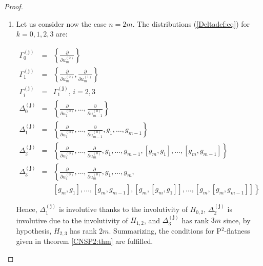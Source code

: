 \documentclass[10pt]{article}
\newcommand{\3}{\mathbf{3}}
\newcommand{\2}{\mathbf{2}}
\newcommand{\1}{\mathbf{1}}
\newcommand{\0}{\mathbf{0}}
\newcommand{\bj}{\mathbf{j}}
\newcommand{\mbf}[1]{\mathbf{#1}}
\newcommand{\ddu}[2]{\frac{\partial}{\partial u_{#1}^{(#2)}}}
\begin{document}
\begin{proof}
\begin{enumerate}
Hence, the system is P$^2$-flat with an order one prolongation of $u_m$. In order to compute the flat outputs, the Brunovsk\'y controllability indices are computed:

$$\kappa_{k}^{(\bj)} \triangleq \# \{ l \mid \rho_{l}^{(\bj)} \geq k \}=3, \quad \forall \, k= 1,\ldots, m.$$

and, therefore, the flat outputs $y_1,\dots,y_{m}$ are the solutions of the system of PDE's:

\[ \left< G_{1}^{(\bj)},  dy_{i} \right>= 0 \]

or, equivalently, the flat outputs $y_1,\dots,y_{m}$ must be independent of $u_1^{(0)},\dots,u_m^{(0)}$ and must be the solution of the system of PDE's

\[ \left< H_{0,2},  dy_{i} \right>= 0 \]

which can be solved thanks to the involutivity of $H_{0,2}$ by application of the Frobenius theorem.



\item Let us consider now the case $n=2m$. The distributions (\ref{Deltadef:eq}) for $k=0,1,2,3$ are:

\begin{equation}
\begin{array}{rcl}
\Gamma_{0}^{(\mbf{j})} &=& \left\{ \ddu{m}{2} \right\} \\
\Gamma_{1}^{(\mbf{j})} &=& \left\{ \ddu{m}{2} , \ddu{m}{1} \right\} \\
\Gamma_{i}^{(\mbf{j})} &=& \Gamma_{1}^{(\mbf{j})}, \, i=2,3 \\
\Delta_{0}^{(\mbf{j})} &=& \left\{ \ddu{1}{0},\dots  , \ddu{m-1}{0} \right\}\\
\Delta_{1}^{(\mbf{j})} &=& \left\{ \ddu{1}{0}, \dots  , \ddu{m-1}{0}, g_1,\dots, g_{m-1} \right\}\\
\Delta_{2}^{(\mbf{j})} &=& \left\{ \ddu{1}{0}, \dots, \ddu{m}{0}, g_1, \dots ,g_{m-1},[g_m,g_1],\dots, [g_m,g_{m-1}] \right\}\\
\Delta_{3}^{(\mbf{j})} &=& \left\{ \ddu{1}{0}, \dots, \ddu{m}{0}, g_1, \dots ,g_{m}, \right. \\
 &&[g_m,g_1],\dots, [g_m,g_{m-1}], [g_m,[g_m,g_1]],\dots, [g_m,[g_m,g_{m-1}]] \left. \right\}
\end{array}
\end{equation}

Hence, $\Delta_{1}^{(\mbf{j})}$ is involutive thanks to the involutivity of $H_{0,2}$, $\Delta_{2}^{(\mbf{j})}$ is involutive due to the involutivity of $H_{1,2}$, and $\Delta_{3}^{(\mbf{j})}$ has rank $3m$ since, by hypothesis, $H_{2,3}$ has rank $2m$. Summarizing, the
conditions for P$^2$-flatness given in theorem \ref{CNSP2:thm} are fulfilled.


\end{enumerate}
\end{proof}
\end{document}
